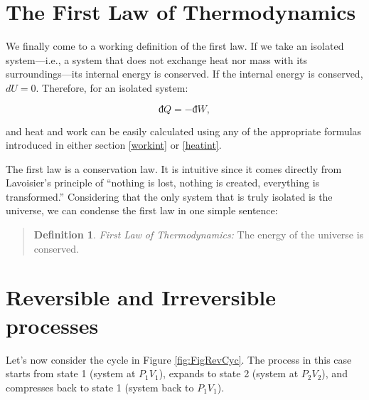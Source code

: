 \documentclass[
  9pt,
]{extbook}
\theoremstyle{definition}
\newtheorem{definition}{Definition}[chapter]
\theoremstyle{definition}
\theoremstyle{definition}
\theoremstyle{remark}
\begin{document}
\hypertarget{the-first-law-of-thermodynamics}{%
\section{The First Law of Thermodynamics}\label{the-first-law-of-thermodynamics}}

We finally come to a working definition of the first law. If we take an isolated system---i.e., a system that does not exchange heat nor mass with its surroundings---its internal energy is conserved. If the internal energy is conserved, \(dU=0\). Therefore, for an isolated system:

\begin{equation}
  đ Q = -đ W,
  \label{eq:heateqwork}
\end{equation}

and heat and work can be easily calculated using any of the appropriate formulas introduced in either section \ref{workint} or \ref{heatint}.

The first law is a conservation law. It is intuitive since it comes directly from Lavoisier's principle of ``nothing is lost, nothing is created, everything is transformed.'' Considering that the only system that is truly isolated is the universe, we can condense the first law in one simple sentence:

\begin{quote}
\begin{definition}
\protect\hypertarget{def:firstlaw}{}{\label{def:firstlaw} }\emph{First Law of Thermodynamics:} The energy of the universe is conserved.
\end{definition}
\end{quote}

\hypertarget{reversible-and-irreversible-processes}{%
\section{Reversible and Irreversible processes}\label{reversible-and-irreversible-processes}}

Let's now consider the cycle in Figure \ref{fig:FigRevCyc}. The process in this case starts from state 1 (system at \(P_1V_1\)), expands to state 2 (system at \(P_2V_2\)), and compresses back to state 1 (system back to \(P_1V_1\)).
\end{document}
